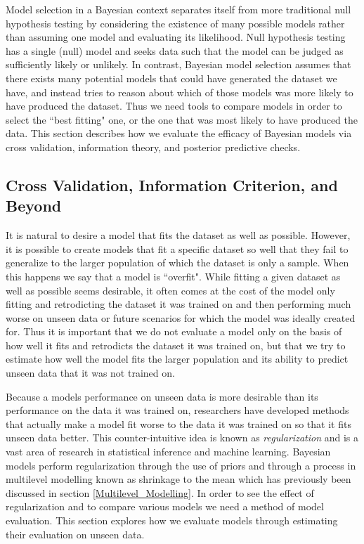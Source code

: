 Model selection in a Bayesian context separates itself from more traditional null hypothesis testing by considering the existence of many possible models rather than assuming one model and evaluating its likelihood. Null hypothesis testing has a single (null) model and seeks data such that the model can be judged as sufficiently likely or unlikely. In contrast, Bayesian model selection assumes that there exists many potential models that could have generated the dataset we have, and instead tries to reason about which of those models was more likely to have produced the dataset. Thus we need tools to compare models in order to select the ``best fitting" one, or the one that was most likely to have produced the data. This section describes how we evaluate the efficacy of Bayesian models via cross validation, information theory, and posterior predictive checks.

\subsection{Cross Validation, Information Criterion, and Beyond}
It is natural to desire a model that fits the dataset as well as possible. However, it is possible to create models that fit a specific dataset so well that they fail to generalize to the larger population of which the dataset is only a sample. When this happens we say that a model is ``overfit". While fitting a given dataset as well as possible seems desirable, it often comes at the cost of the model only fitting and retrodicting the dataset it was trained on and then performing much worse on unseen data or future scenarios for which the model was ideally created for. Thus it is important that we do not evaluate a model only on the basis of how well it fits and retrodicts the dataset it was trained on, but that we try to estimate how well the model fits the larger population and its ability to predict unseen data that it was not trained on.

Because a models performance on unseen data is more desirable than its performance on the data it was trained on, researchers have developed methods that actually make a model fit worse to the data it was trained on so that it fits unseen data better. This counter-intuitive idea is known as \textit{regularization} and is a vast area of research in statistical inference and machine learning. Bayesian models perform regularization through the use of priors and through a process in multilevel modelling known as shrinkage to the mean which has previously been discussed in section \ref{Multilevel_Modelling}. In order to see the effect of regularization and to compare various models we need a method of model evaluation. This section explores how we evaluate models through estimating their evaluation on unseen data.

